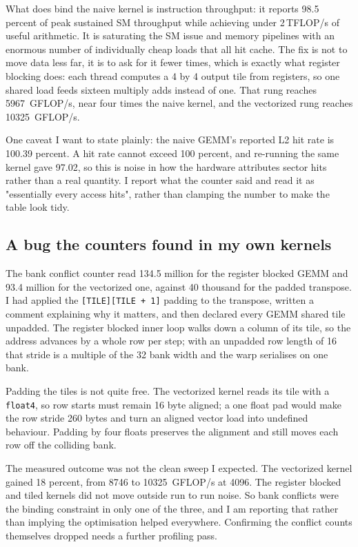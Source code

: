 What does bind the naive kernel is instruction throughput: it reports 98.5
percent of peak sustained SM throughput while achieving under 2\,TFLOP/s of
useful arithmetic. It is saturating the SM issue and memory pipelines with an
enormous number of individually cheap loads that all hit cache. The fix is not to
move data less far, it is to ask for it fewer times, which is exactly what
register blocking does: each thread computes a 4 by 4 output tile from registers,
so one shared load feeds sixteen multiply adds instead of one. That rung reaches
\SI{5967}{GFLOP/s}, near four times the naive kernel, and the vectorized rung
reaches \SI{10325}{GFLOP/s}.

One caveat I want to state plainly: the naive GEMM's reported L2 hit rate is
100.39 percent. A hit rate cannot exceed 100 percent, and re-running the same
kernel gave 97.02, so this is noise in how the hardware attributes sector hits
rather than a real quantity. I report what the counter said and read it as
"essentially every access hits", rather than clamping the number to make the
table look tidy.

\subsection{A bug the counters found in my own kernels}

The bank conflict counter read 134.5 million for the register blocked GEMM and
93.4 million for the vectorized one, against 40 thousand for the padded
transpose. I had applied the \texttt{[TILE][TILE + 1]} padding to the transpose,
written a comment explaining why it matters, and then declared every GEMM shared
tile unpadded. The register blocked inner loop walks down a column of its tile,
so the address advances by a whole row per step; with an unpadded row length of
16 that stride is a multiple of the 32 bank width and the warp serialises on one
bank.

Padding the tiles is not quite free. The vectorized kernel reads its tile with a
\texttt{float4}, so row starts must remain 16 byte aligned; a one float pad would
make the row stride 260 bytes and turn an aligned vector load into undefined
behaviour. Padding by four floats preserves the alignment and still moves each
row off the colliding bank.

The measured outcome was not the clean sweep I expected. The vectorized kernel
gained 18 percent, from 8746 to \SI{10325}{GFLOP/s} at 4096. The register blocked
and tiled kernels did not move outside run to run noise. So bank conflicts were
the binding constraint in only one of the three, and I am reporting that rather
than implying the optimisation helped everywhere. Confirming the conflict counts
themselves dropped needs a further profiling pass.

